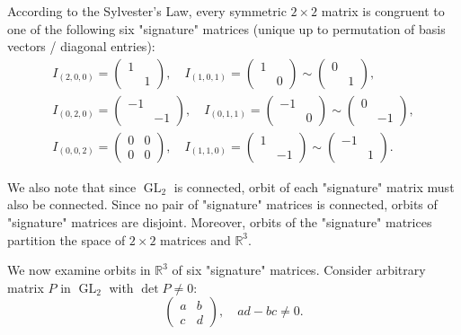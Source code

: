 \documentclass{article}
\theoremstyle{definition}
\newcommand{\R}{\mathbb{R}}
\newcommand{\GL}{\operatorname{GL}}
\begin{document}
According to the Sylvester's Law, every symmetric $2 \times 2$ matrix is congruent to one of the following six "signature" matrices (unique up to permutation of basis vectors / diagonal entries):
\begin{gather*}
	I_{(2,0,0)} = 
	\begin{pmatrix}
		1 &  \\
		 & 1
	\end{pmatrix},
	\quad
	I_{(1,0,1)} = 
	\begin{pmatrix}
		1 &  \\
		 & 0
	\end{pmatrix}
	\sim
	\begin{pmatrix}
		0 &  \\
		 & 1
	\end{pmatrix},
	\\
	I_{(0,2,0)} =
	\begin{pmatrix}
		-1 &  \\
		 & -1
	\end{pmatrix},
	\quad
	I_{(0,1,1)} = 
	\begin{pmatrix}
		-1 &  \\
		 & 0
	\end{pmatrix}
	\sim
	\begin{pmatrix}
		0 &  \\
		 & -1
	\end{pmatrix},
	\\
	I_{(0,0,2)} =
	\begin{pmatrix}
		0 & 0 \\
		0 & 0
	\end{pmatrix},
	\quad
	I_{(1,1,0)} =
	\begin{pmatrix}
		1 &  \\
		 & -1
	\end{pmatrix}
	\sim
	\begin{pmatrix}
		-1 &  \\
		 & 1
	\end{pmatrix}.
\end{gather*}

We also note that since $\GL_2$ is connected, orbit of each "signature" matrix must also be connected.
Since no pair of "signature" matrices is connected, orbits of "signature" matrices are disjoint.
Moreover, orbits of the "signature" matrices partition the space of $2 \times 2$ matrices and $\R^3$.

We now examine orbits in $\R^3$ of six "signature" matrices.
Consider arbitrary matrix $P$ in $\GL_2$ with $\det P \neq 0$:
\[
	\begin{pmatrix}
		a & b \\
		c & d
	\end{pmatrix},
	\quad ad-bc \neq 0.
\]
\end{document}

